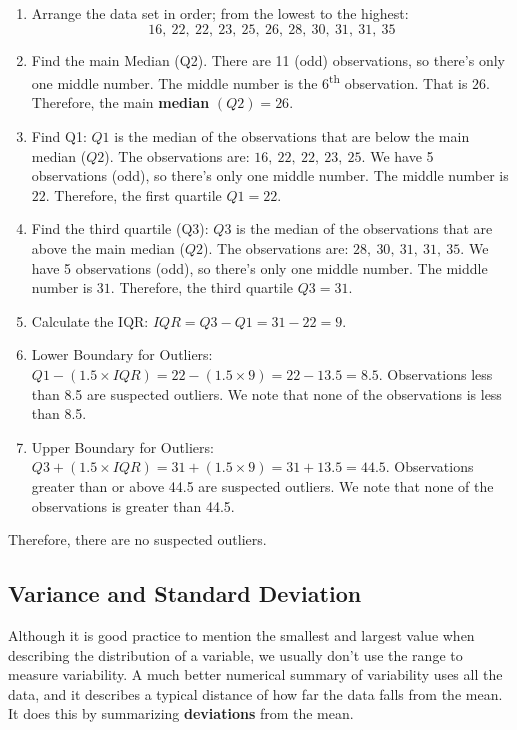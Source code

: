 \begin{enumerate}
    \item Arrange the data set in order; from the lowest to the highest:
\[
16, \ 22, \ 22, \ 23, \ 25, \ 26, \ 28, \ 30, \ 31, \ 31, \ 35
\]
    \item Find the main Median (Q2). There are 11 (odd) observations, so there’s only one middle number. The middle number is the 6\textsuperscript{th} observation. That is \(26\). Therefore, the main \textbf{median} \( (Q2) = 26 \).
    
    \item Find Q1: \( Q1 \) is the median of the observations that are below the main median (\( Q2 \)). The observations are: \( 16, \ 22, \ 22, \ 23, \ 25 \). We have 5 observations (odd), so there’s only one middle number. The middle number is \( 22 \).
Therefore, the first quartile \( Q1 = 22 \).

    \item Find the third quartile (Q3): \( Q3 \) is the median of the observations that are above the main median (\( Q2 \)). The observations are: \( 28, \ 30, \ 31, \ 31, \ 35 \). We have 5 observations (odd), so there’s only one middle number. The middle number is \(31\). Therefore, the third quartile \( Q3 = 31 \).

    \item Calculate the IQR: \(IQR = Q3 - Q1 = 31 - 22 = 9\).
    \item Lower Boundary for Outliers: \(Q1 - (1.5 \times IQR) = 22 - (1.5 \times 9) = 22 - 13.5 = 8.5\). Observations less than 8.5 are suspected outliers. We note that none of the observations is less than 8.5.

    \item Upper Boundary for Outliers: \( Q3 + (1.5 \times IQR) = 31 + (1.5 \times 9) = 31 + 13.5 = 44.5 \). Observations greater than or above 44.5 are suspected outliers. We note that none of the observations is greater than 44.5.
\end{enumerate}

Therefore, there are no suspected outliers.

\subsection{Variance and Standard Deviation}
Although it is good practice to mention the smallest and largest value when describing the distribution of a variable, we usually don’t use the range to measure variability. A much better numerical summary of variability uses all the data, and it describes a typical distance of how far the data falls from the mean. It does this by summarizing \textbf{deviations} from the mean.

